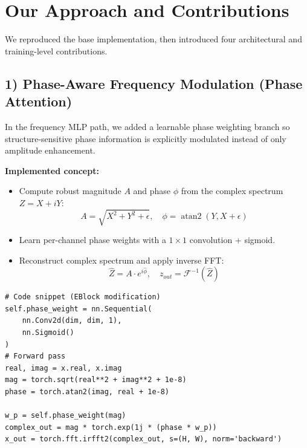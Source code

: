\documentclass[10pt,twocolumn]{article}
\begin{document}
\section{Our Approach and Contributions}

We reproduced the base implementation, then introduced four architectural and training-level contributions.

\subsection{1) Phase-Aware Frequency Modulation (Phase Attention)}
In the frequency MLP path, we added a learnable phase weighting branch so structure-sensitive phase information is explicitly modulated instead of only amplitude enhancement.

\textbf{Implemented concept:}
\begin{itemize}
  \item Compute robust magnitude $A$ and phase $\phi$ from the complex spectrum $Z = X + iY$:
  \begin{equation*}
      A = \sqrt{X^2 + Y^2 + \epsilon}, \quad \phi = \operatorname{atan2}(Y, X + \epsilon)
  \end{equation*}
  \item Learn per-channel phase weights with a $1\times1$ convolution + sigmoid.
  \item Reconstruct complex spectrum and apply inverse FFT:
  \begin{equation*}
      \hat{Z} = A \cdot e^{i \hat{\phi}}, \quad z_{out} = \mathcal{F}^{-1}(\hat{Z})
  \end{equation*}
\end{itemize}
\begin{lstlisting}
# Code snippet (EBlock modification)
self.phase_weight = nn.Sequential(
    nn.Conv2d(dim, dim, 1),
    nn.Sigmoid()
)
# Forward pass
real, imag = x.real, x.imag
mag = torch.sqrt(real**2 + imag**2 + 1e-8)
phase = torch.atan2(imag, real + 1e-8)

w_p = self.phase_weight(mag)
complex_out = mag * torch.exp(1j * (phase * w_p))
x_out = torch.fft.irfft2(complex_out, s=(H, W), norm='backward')
\end{lstlisting}
\end{document}
